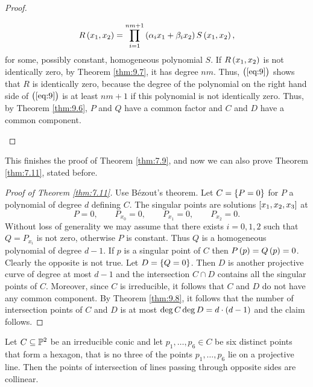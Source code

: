\begin{proof}
\begin{enumerate}
\begin{equation}
\label{eq:9}
R\br{x_1, x_2} = \prod_{i = 1}^{nm + 1} \br{\alpha_ix_1 + \beta_ix_2}S\br{x_1, x_2},
\end{equation}
for some, possibly constant, homogeneous polynomial $ S $. If $ R\br{x_1, x_2} $ is not identically zero, by Theorem \ref{thm:9.7}, it has degree $ nm $. Thus, $ \br{\ref{eq:9}} $ shows that $ R $ is identically zero, because the degree of the polynomial on the right hand side of $ \br{\ref{eq:9}} $ is at least $ nm + 1 $ if this polynomial is not identically zero. Thus, by Theorem \ref{thm:9.6}, $ P $ and $ Q $ have a common factor and $ C $ and $ D $ have a common component.
\end{enumerate}
\end{proof}

This finishes the proof of Theorem \ref{thm:7.9}, and now we can also prove Theorem \ref{thm:7.11}, stated before.

\pagebreak

\begin{proof}[Proof of Theorem \ref{thm:7.11}]
Use B\'ezout's theorem. Let $ C = \cbr{P = 0} $ for $ P $ a polynomial of degree $ d $ defining $ C $. The singular points are solutions $ \sbr{x_1, x_2, x_3} $ at
$$ P = 0, \qquad P_{x_0} = 0, \qquad P_{x_1} = 0, \qquad P_{x_2} = 0. $$
Without loss of generality we may assume that there exists $ i = 0, 1, 2 $ such that $ Q = P_{x_i} $ is not zero, otherwise $ P $ is constant. Thus $ Q $ is a homogeneous polynomial of degree $ d - 1 $. If $ p $ is a singular point of $ C $ then $ P\br{p} = Q\br{p} = 0 $. Clearly the opposite is not true. Let $ D = \cbr{Q = 0} $. Then $ D $ is another projective curve of degree at most $ d - 1 $ and the intersection $ C \cap D $ contains all the singular points of $ C $. Moreover, since $ C $ is irreducible, it follows that $ C $ and $ D $ do not have any common component. By Theorem \ref{thm:9.8}, it follows that the number of intersection points of $ C $ and $ D $ is at most $ \deg C\deg D = d \cdot \br{d - 1} $ and the claim follows.
\end{proof}

\begin{proposition}
Let $ C \subseteq \mathbb{P}^2 $ be an irreducible conic and let $ p_1, \dots, p_6 \in C $ be six distinct points that form a hexagon, that is no three of the points $ p_1, \dots, p_6 $ lie on a projective line. Then the points of intersection of lines passing through opposite sides are collinear.
\end{proposition}

